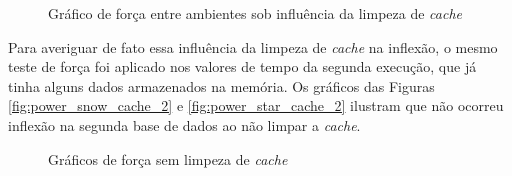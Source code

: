 \begin{figure}[htpb]
        \centering
        \caption{Gráfico de força entre ambientes sob influência da limpeza de \textit{cache}}
        \label{fig:power_cache}
\end{figure}

Para averiguar de fato essa influência da limpeza de \textit{cache} na inflexão, o mesmo teste de força foi aplicado nos valores de tempo da segunda execução, que já tinha alguns dados armazenados na memória. Os gráficos das Figuras \ref{fig:power_snow_cache_2} e \ref{fig:power_star_cache_2} ilustram que não ocorreu inflexão na segunda base de dados ao não limpar a \textit{cache}.

\begin{figure}[htpb]
        \centering
        \caption{Gráficos de força sem limpeza de \textit{cache}}
        \label{fig:power_cache_2}
\end{figure}


